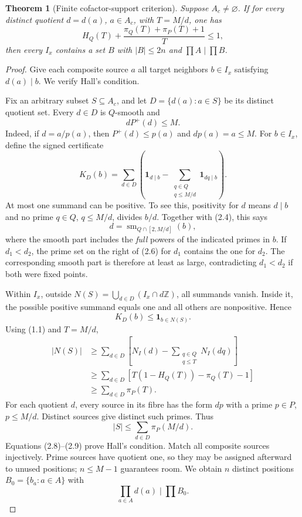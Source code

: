 \documentclass[11pt,a4paper]{article}
\newtheorem{theorem}{Theorem}[section]
\theoremstyle{remark}
\newcommand{\ind}{\mathbf 1}
\newcommand{\sm}{\operatorname{sm}}
\newcommand{\ZZ}{\mathbb Z}
\begin{document}
\begin{theorem}[Finite cofactor-support criterion]
\label{thm:exact}
Suppose \(A_c\ne\varnothing\). If for every distinct quotient
\(d=d(a)\), \(a\in A_c\), with \(T=M/d\), one has
\[
 H_Q(T)+\frac{\pi_Q(T)+\pi_P(T)+1}{T}\le1,
 \tag{2.3}
\]
then every \(I_x\) contains a set \(B\) with \(|B|\le2n\) and
\(\prod A\mid\prod B\).
\end{theorem}

\begin{proof}
Give each composite source \(a\) all target neighbors \(b\in I_x\)
satisfying \(d(a)\mid b\). We verify Hall's condition.

Fix an arbitrary subset \(S\subseteq A_c\), and let
\(D=\{d(a):a\in S\}\) be its distinct quotient set. Every \(d\in D\)
is \(Q\)-smooth and
\[
 dP^+(d)\le M.
 \tag{2.4}
\]
Indeed, if \(d=a/p(a)\), then \(P^+(d)\le p(a)\) and \(dp(a)=a\le M\).
For \(b\in I_x\), define the signed certificate
\[
 K_D(b)=\sum_{d\in D}
 \left(\ind_{d\mid b}-
       \sum_{\substack{q\in Q\\q\le M/d}}\ind_{dq\mid b}\right).
 \tag{2.5}
\]
At most one summand can be positive. To see this, positivity for \(d\)
means \(d\mid b\) and no prime \(q\in Q\), \(q\le M/d\), divides \(b/d\).
Together with (2.4), this says
\[
 d=\sm_{Q\cap[2,M/d]}(b),
 \tag{2.6}
\]
where the smooth part includes the \emph{full} powers of the indicated
primes in \(b\). If \(d_1<d_2\), the prime set on the right of (2.6)
for \(d_1\) contains the one for \(d_2\). The corresponding smooth part
is therefore at least as large, contradicting \(d_1<d_2\) if both
were fixed points.

Within \(I_x\), outside \(N(S)=\bigcup_{d\in D}(I_x\cap d\ZZ)\),
all summands vanish.
Inside it, the possible positive summand equals one and all others
are nonpositive. Hence
\[
 K_D(b)\le\ind_{b\in N(S)}.
 \tag{2.7}
\]
Using (1.1) and \(T=M/d\),
\[
 \begin{split}
 |N(S)|
 &\ge\sum_{d\in D}\left[N_I(d)-
                \sum_{\substack{q\in Q\\q\le T}}N_I(dq)\right]\\
 &\ge\sum_{d\in D}
       \left[T(1-H_Q(T))-\pi_Q(T)-1\right]\\
 &\ge\sum_{d\in D}\pi_P(T).
 \end{split}
 \tag{2.8}
\]
For each quotient \(d\), every source in its fibre has the form \(dp\)
with a prime \(p\in P\), \(p\le M/d\). Distinct sources give distinct
such primes. Thus
\[
 |S|\le\sum_{d\in D}\pi_P(M/d).
 \tag{2.9}
\]
Equations (2.8)--(2.9) prove Hall's condition. Match all composite
sources injectively. Prime sources have quotient one, so they may be
assigned afterward to unused positions; \(n\le M-1\) guarantees room.
We obtain \(n\) distinct positions \(B_0=\{b_a:a\in A\}\) with
\[
 \prod_{a\in A}d(a)\mid\prod B_0.
 \tag{2.10}
\]


\end{proof}
\end{document}
